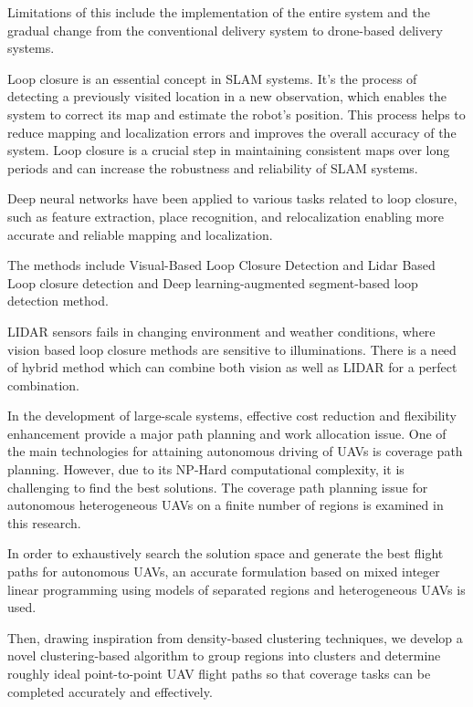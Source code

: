 \documentclass[conference]{IEEEtran}
\begin{document}
Limitations of this include the implementation of the entire system and the gradual change from the conventional delivery system to drone-based delivery systems\cite{jarrah2022flight}.



Loop closure is an essential concept in SLAM systems. It’s the process of detecting a previously visited location in a new observation, which enables the system to correct its map and estimate the robot's position. This process helps to reduce mapping and localization errors and improves the overall accuracy of the system. Loop closure is a crucial step in maintaining consistent maps over long periods and can increase the robustness and reliability of SLAM systems.

Deep neural networks have been applied to various tasks related to loop closure, such as feature extraction, place recognition, and relocalization enabling more accurate and reliable mapping and localization.

The methods include Visual-Based Loop Closure Detection and Lidar Based Loop closure detection and Deep learning-augmented segment-based loop detection method. 

LIDAR sensors fails in changing environment and weather conditions, where vision based loop closure methods are sensitive to illuminations. There is a need of hybrid method which can combine both vision as well as LIDAR for a perfect combination\cite{arshad2021loop}.


In the development of large-scale systems, effective cost reduction and flexibility enhancement provide a major path planning and work allocation issue. One of the main technologies for attaining autonomous driving of UAVs is coverage path planning. However, due to its NP-Hard computational complexity, it is challenging to find the best solutions. The coverage path planning issue for autonomous heterogeneous UAVs on a finite number of regions is examined in this research. 

In order to exhaustively search the solution space and generate the best flight paths for autonomous UAVs, an accurate formulation based on mixed integer linear programming using models of separated regions and heterogeneous UAVs is used. 

Then, drawing inspiration from density-based clustering techniques, we develop a novel clustering-based algorithm to group regions into clusters and determine roughly ideal point-to-point UAV flight paths so that coverage tasks can be completed accurately and effectively\cite{chen2022coverage}. 
\end{document}

